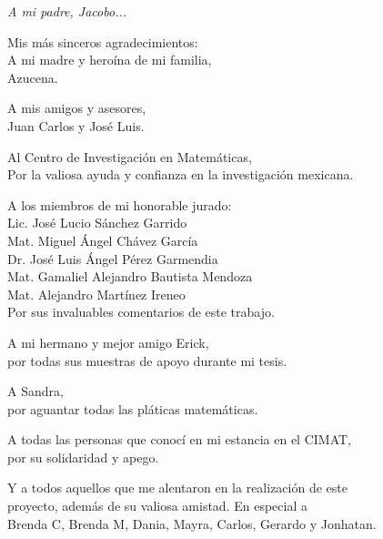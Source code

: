 \thispagestyle{empty}
\begin{flushright}
\textit{A mi padre, Jacobo...}
\end{flushright}

\newpage

\thispagestyle{empty}
\begin{flushright}

\flushright Mis más sinceros agradecimientos: \\

\flushright A mi madre y heroína de mi familia, \\ Azucena.

\flushright A mis amigos y asesores, \\ Juan Carlos y José Luis.

\flushright Al Centro de Investigación en Matemáticas, \\ Por la valiosa ayuda y confianza en la investigación mexicana.

\flushright A los miembros de mi honorable jurado: \\ 
 
\flushright Lic. José Lucio Sánchez Garrido \\ 
Mat. Miguel Ángel Chávez García \\ 
Dr. José Luis Ángel Pérez Garmendia \\ 
Mat. Gamaliel Alejandro Bautista Mendoza \\ 
Mat. Alejandro Martínez Ireneo \\ 
 
\flushright Por sus invaluables comentarios de este trabajo.

\flushright A mi hermano y mejor amigo Erick, \\ por todas sus muestras de apoyo durante mi tesis.

\flushright A Sandra, \\ por aguantar todas las pláticas matemáticas.

\flushright A todas las personas que conocí en mi estancia en el CIMAT, \\ por su solidaridad y apego.

\flushright Y a todos aquellos que me alentaron en la realización de este \\ proyecto, además de su valiosa amistad. En especial a \\ Brenda C, Brenda M, Dania, Mayra, Carlos, Gerardo y Jonhatan.

\end{flushright}